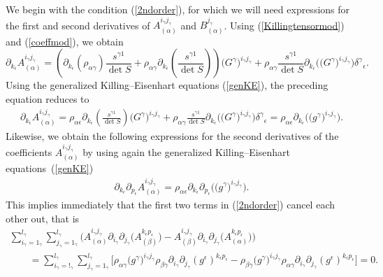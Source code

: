 \documentclass[pdftex]{sigma}
\numberwithin{equation}{section}
\newcommand{\igamma}{i_{\gamma}}
\newcommand{\jgamma}{j_{\gamma}}
\newcommand{\lgamma}{l_{\gamma}}
\newcommand{\kepsilon}{k_{\epsilon}}
\newcommand{\pepsilon}{p_{\epsilon}}
\begin{document}
We begin with the condition (\ref{2ndorder}), for which we will need expressions for the first and second derivatives of $A_{(\alpha)}^{\igamma \jgamma}$ and $B_{(\alpha)}^{\jgamma}$. Using (\ref{Killingtensormod}) and (\ref{coeffmod}), we obtain
\[
\partial_{\kepsilon}A_{(\alpha)}^{\igamma \jgamma}=\left(\partial_{\kepsilon}(\rho_{\alpha \gamma}) \frac{s^{\gamma 1}}{\det S}+\rho_{\alpha \gamma}\partial_{\kepsilon}\left(\frac{s^{\gamma 1}}{\det S}\right)\right)\big(G^{\gamma}\big)^{\igamma \jgamma}+\rho_{\alpha \gamma}\frac{s^{\gamma 1}}{\det S}\partial_{\kepsilon}\big(\big(G^{\gamma}\big)^{\igamma \jgamma}\big){\delta^{\gamma}}_{\epsilon}.
\]
Using the generalized Killing--Eisenhart equations (\ref{genKE}), the preceding equation reduces to
\begin{gather}\label{firstA}
\partial_{\kepsilon}A_{(\alpha)}^{\igamma \jgamma}=\rho_{\alpha \epsilon}\partial_{\kepsilon}\left(\frac{s^{\gamma 1}}{\det S}\right)\big(G^{\gamma}\big)^{\igamma \jgamma}\!+\rho_{\alpha \gamma}\frac{s^{\gamma 1}}{\det S}\partial_{\kepsilon}\big(\big(G^{\gamma}\big)^{\igamma \jgamma}\big){\delta^{\gamma}}_{\epsilon}
=\rho_{\alpha \epsilon}\partial_{\kepsilon}\big(\big(g^{\gamma}\big)^{\igamma \jgamma}\big).\!\!\!\!
\end{gather}
Likewise, we obtain the following expressions for the second derivatives of the coefficients $A_{(\alpha)}^{\igamma \jgamma}$ by using again the generalized Killing--Eisenhart equations~(\ref{genKE})
\begin{gather}\label{secondA}
\partial_{\kepsilon}\partial_{\pepsilon}A_{(\alpha)}^{\igamma \jgamma}=\rho_{\alpha \epsilon}\partial_{\kepsilon}\partial_{\pepsilon}\big(\big(g^{\gamma}\big)^{\igamma \jgamma}\big).
\end{gather}
This implies immediately that the first two terms in (\ref{2ndorder}) cancel each other out, that is
\begin{gather}
\sum_{\igamma=1_{\gamma}}^{\lgamma}\sum_{\jgamma=1_{\gamma}}^{\lgamma}\big(A_{(\alpha)}^{\igamma \jgamma}\partial_{\igamma}\partial_{\jgamma}\big(A_{(\beta)}^{\kepsilon \pepsilon}\big)-A_{(\beta)}^{\igamma \jgamma}\partial_{\igamma}\partial_{\jgamma}\big(A_{(\alpha)}^{\kepsilon \pepsilon}\big)\big)\nonumber\\
\qquad{} =\sum_{\igamma=!_{\gamma}}^{\lgamma}\sum_{\jgamma=1_{\gamma}}^{\lgamma}\big[\rho_{\alpha \gamma} \big(g^{\gamma}\big)^{\igamma \jgamma}\rho_{\beta \gamma}\partial_{\igamma}\partial_{\jgamma}(g^{\epsilon})^{\kepsilon \pepsilon}-\rho_{\beta \gamma} \big(g^{\gamma}\big)^{\igamma \jgamma}\rho_{\alpha \gamma}\partial_{\igamma}\partial_{\jgamma}(g^{\epsilon})^{\kepsilon \pepsilon}\big]=0.\!\!\!\!\label{cancel}
\end{gather}
\end{document}
